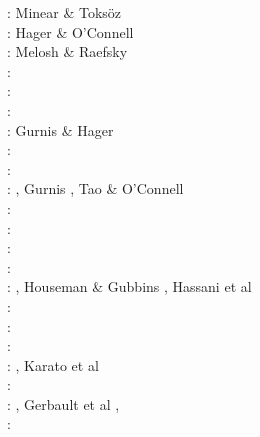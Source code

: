 \begin{scriptsize}
\noindent
\nineteenseventy: Minear \& Toks{\"o}z \cite{mito70}\\
\nineteenseventyeight: Hager \& O'Connell \cite{haoc78}\\
\nineteeneighty: Melosh \& Raefsky \cite{mera80}\\
\nineteeneightytwo: \cite{crpi82}\\
\nineteeneightyfive: \cite{thar85}\\
\nineteeneightysix: \cite{jarr86}\cite{mipb96}\\
\nineteeneightyeight: Gurnis \& Hager \cite{guha88}\\
\nineteeneightynine: \cite{boww89}\cite{mibj89}\cite{hesw89}\\
\nineteenninety: \cite{hstt90}\cite{kiha90}\\
\nineteenninetytwo: \cite{zhgu92}\cite{whbw92}, Gurnis \cite{gurn92}, Tao \& O'Connell \cite{taoc92}\\
\nineteenninetythree: \cite{jope93}\cite{dvnm93}\cite{wibf93}\cite{shem93}\\
\nineteenninetyfour: \cite{zhgu94}\cite{wibe94}\cite{wdbo94a}\cite{wdbo94b}\cite{bequ94}\cite{gaha94}\\
\nineteenninetyfive: \cite{masa95}\\
\nineteenninetysix: \cite{chri96}\cite{gisb96}\cite{wabe96}\cite{zhgu96}\\
\nineteenninetyseven: \cite{hajc97}\cite{kisa97}\cite{olwh97}\cite{nesg97}, 
                      Houseman \& Gubbins \cite{hogu97}, Hassani et al \cite{hajc97}\\
\nineteenninetyeight: \cite{itki98}\cite{buwg98}\cite{brmy98}\cite{jabf98}\cite{wabb98}\\
\nineteenninetynine: \cite{hagu99}\cite{befo99}\cite{bumo99}\cite{roda99}
                     \cite{elbp99}\cite{scmr99}\cite{elbe99}
                     \cite{beep99}\cite{nesb99}\\
\twothousand: \cite{tesc00}\cite{brky00}\cite{bemh00}\cite{chlb00}\\
\twothousandone: \cite{bujl01}\cite{bugw01}\cite{chys01}\cite{coha01}, Karato et al \cite{kary01}\\
\twothousandtwo: \cite{civv02}\cite{clbb02}\cite{gesp02}\cite{ster02}\cite{jabn02}\\
\twothousandthree: \cite{refm03}\cite{fumr03}, Gerbault et al \cite{gehd03}, \cite{bigs03}\\
\twothousandfour: \cite{toba04}\cite{bocj04}\cite{bejn04}\cite{tobj04}\cite{sche04}\cite{sche04b}\cite{enwi04}

\end{scriptsize}
